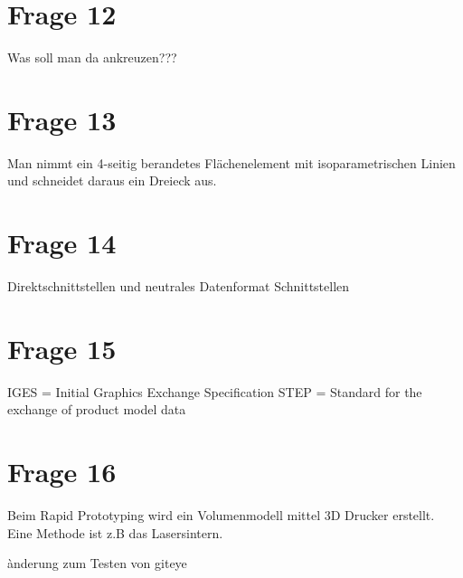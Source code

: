 \section{Frage 12}

Was soll man da ankreuzen???


\section{Frage 13}

Man nimmt ein 4-seitig berandetes Flächenelement mit isoparametrischen Linien und schneidet daraus ein Dreieck aus.

\section{Frage 14}

Direktschnittstellen und neutrales Datenformat Schnittstellen

\section{Frage 15}

IGES = Initial Graphics Exchange Specification
STEP = Standard for the exchange of product model data

\section{Frage 16}

Beim Rapid Prototyping wird ein Volumenmodell mittel 3D Drucker erstellt. Eine Methode ist z.B das Lasersintern.


ànderung zum Testen von giteye




